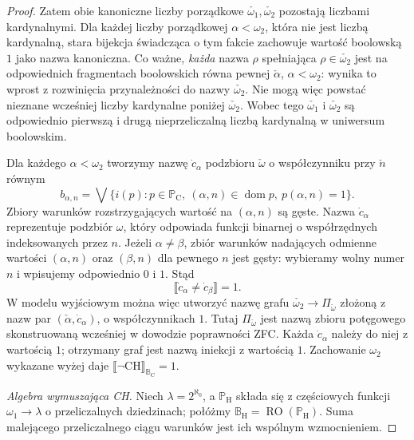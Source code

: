 \begin{proof}
Zatem obie kanoniczne
liczby porządkowe
$\check{\omega_1},\check{\omega_2}$
pozostają liczbami kardynalnymi.
Dla każdej liczby
porządkowej $\alpha<\omega_2$,
która nie jest liczbą kardynalną,
stara bijekcja świadcząca
o tym fakcie zachowuje
wartość boolowską $1$
jako nazwa kanoniczna.
Co ważne, \emph{każda}
nazwa $\rho$ spełniająca
$\rho\in\check{\omega_2}$
jest na odpowiednich
fragmentach boolowskich
równa pewnej
$\check\alpha$, $\alpha<\omega_2$:
wynika to wprost z rozwinięcia
przynależności do nazwy
$\check{\omega_2}$.
Nie mogą więc powstać
nieznane wcześniej liczby kardynalne
poniżej $\check{\omega_2}$.
Wobec tego
$\check{\omega_1}$ i
$\check{\omega_2}$ są
odpowiednio pierwszą i
drugą nieprzeliczalną
liczbą kardynalną w uniwersum
boolowskim.

Dla każdego $\alpha<\omega_2$
tworzymy nazwę
$\dot c_\alpha$ podzbioru
$\check\omega$ o współczynniku
przy $\check n$ równym
\[
 b_{\alpha,n}
 =\bigvee\{i(p):p\in\mathbb P_{\mathrm C},\
       (\alpha,n)\in\operatorname{dom}p,\
       p(\alpha,n)=1\}.
\]
Zbiory warunków rozstrzygających
wartość na $(\alpha,n)$
są gęste. Nazwa
$\dot c_\alpha$ reprezentuje
podzbiór $\omega$, który
odpowiada funkcji binarnej
o współrzędnych
indeksowanych przez $n$.
Jeżeli $\alpha\ne\beta$,
zbiór warunków nadających
odmienne wartości
$(\alpha,n)$ oraz
$(\beta,n)$ dla pewnego
$n$ jest gęsty: wybieramy
wolny numer $n$ i wpisujemy
odpowiednio $0$ i $1$.
Stąd
\[
 \llbracket\dot c_\alpha
           \ne\dot c_\beta
           \rrbracket=1.
\]
W modelu wyjściowym można
więc utworzyć nazwę grafu
$\check{\omega_2}\to
\Pi_{\check\omega}$
złożoną z nazw par
$(\check\alpha,\dot c_\alpha)$,
o współczynnikach $1$.
Tutaj $\Pi_{\check\omega}$
jest nazwą zbioru potęgowego
skonstruowaną wcześniej
w dowodzie poprawności ZFC.
Każda $\dot c_\alpha$
należy do niej z wartością $1$;
otrzymany graf jest
nazwą iniekcji
z wartością $1$.
Zachowanie $\omega_2$
wykazane wyżej daje
$\llbracket\neg\mathrm{CH}
\rrbracket_{\mathbb B_{\mathrm C}}=1$.

\emph{Algebra wymuszająca CH.}
Niech $\lambda=2^{\aleph_0}$,
a $\mathbb P_{\mathrm H}$
składa się z częściowych funkcji
$\omega_1\to\lambda$
o przeliczalnych dziedzinach;
połóżmy
$\mathbb B_{\mathrm H}
=\operatorname{RO}(\mathbb P_{\mathrm H})$.
Suma malejącego przeliczalnego
ciągu warunków jest ich
wspólnym wzmocnieniem.


\end{proof}
